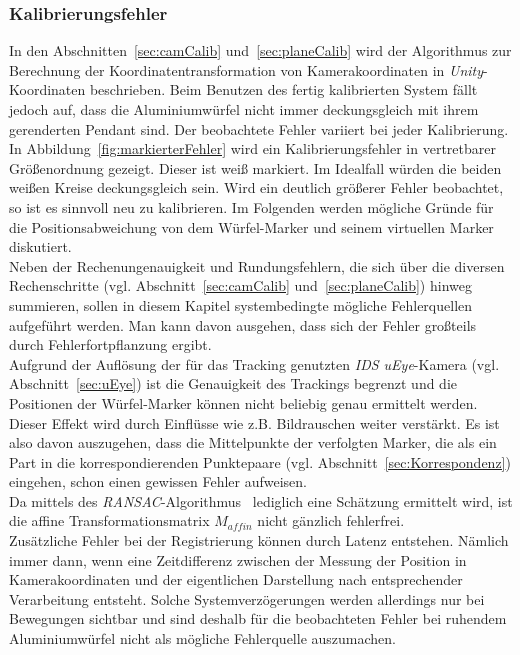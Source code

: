 \subsubsection{Kalibrierungsfehler} \label{sec:calibError}
In den Abschnitten~\ref{sec:camCalib} und~\ref{sec:planeCalib} wird der Algorithmus zur Berechnung der Koordinatentransformation von Kamerakoordinaten in \emph{Unity}-Koordinaten beschrieben. Beim Benutzen des fertig kalibrierten System fällt jedoch auf, dass die Aluminiumwürfel nicht immer deckungsgleich mit ihrem gerenderten Pendant sind. Der beobachtete Fehler variiert bei jeder Kalibrierung. In Abbildung~\ref{fig:markierterFehler} wird ein Kalibrierungsfehler in vertretbarer Größenordnung gezeigt. Dieser ist weiß markiert. Im Idealfall würden die beiden weißen Kreise deckungsgleich sein. Wird ein deutlich größerer Fehler beobachtet, so ist es sinnvoll neu zu kalibrieren. Im Folgenden werden mögliche Gründe für die Positionsabweichung von dem Würfel-Marker und seinem virtuellen Marker diskutiert. \\
Neben der Rechenungenauigkeit und Rundungsfehlern, die sich über die diversen Rechenschritte (vgl. Abschnitt~\ref{sec:camCalib} und~\ref{sec:planeCalib}) hinweg summieren, sollen in diesem Kapitel systembedingte mögliche Fehlerquellen aufgeführt werden. Man kann davon ausgehen, dass sich der Fehler großteils durch Fehlerfortpflanzung \cite{schmalstieg2016augmented} ergibt.\\ 
Aufgrund der Auflösung der für das Tracking genutzten \textit{IDS uEye}-Kamera (vgl. Abschnitt~\ref{sec:uEye}) ist die Genauigkeit des Trackings begrenzt und die Positionen der Würfel-Marker können nicht beliebig genau ermittelt werden. Dieser Effekt wird durch Einflüsse wie z.B. Bildrauschen weiter verstärkt. Es ist also davon auszugehen, dass die Mittelpunkte der verfolgten Marker, die als ein Part in die korrespondierenden Punktepaare (vgl. Abschnitt~\ref{sec:Korrespondenz}) eingehen, schon einen gewissen Fehler aufweisen. \\
Da mittels des \textit{RANSAC}-Algorithmus~\cite{articel:RANSAC} lediglich eine Schätzung ermittelt wird, ist die affine Transformationsmatrix $M_{affin}$ nicht gänzlich fehlerfrei.\\
Zusätzliche Fehler bei der Registrierung können durch Latenz entstehen. Nämlich immer dann, wenn eine Zeitdifferenz zwischen der Messung der Position in Kamerakoordinaten und der eigentlichen Darstellung nach entsprechender
Verarbeitung entsteht. Solche Systemverzögerungen werden allerdings nur bei Bewegungen sichtbar und sind deshalb für die beobachteten Fehler bei ruhendem Aluminiumwürfel nicht als mögliche Fehlerquelle auszumachen. 

